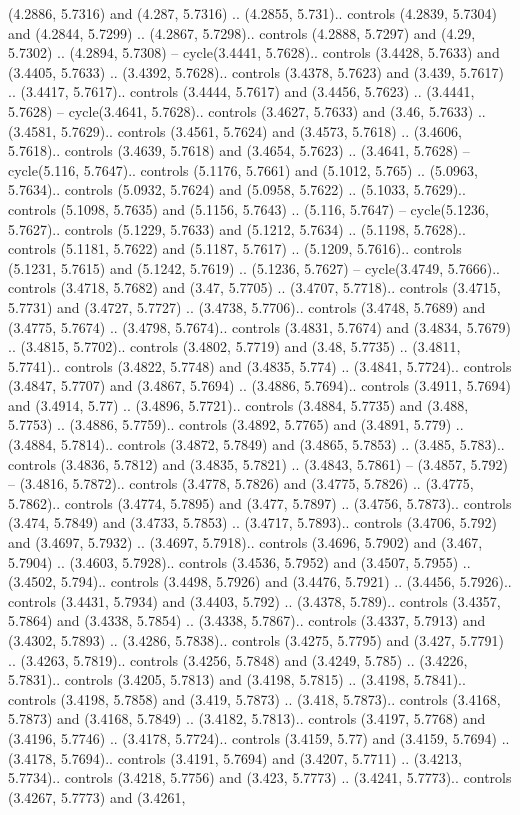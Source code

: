 (4.2886, 5.7316) and (4.287, 5.7316) .. (4.2855, 5.731).. controls (4.2839, 5.7304) and (4.2844, 5.7299) .. (4.2867, 5.7298).. controls (4.2888, 5.7297) and (4.29, 5.7302) .. (4.2894, 5.7308) -- cycle(3.4441, 5.7628).. controls (3.4428, 5.7633) and (3.4405, 5.7633) .. (3.4392, 5.7628).. controls (3.4378, 5.7623) and (3.439, 5.7617) .. (3.4417, 5.7617).. controls (3.4444, 5.7617) and (3.4456, 5.7623) .. (3.4441, 5.7628) -- cycle(3.4641, 5.7628).. controls (3.4627, 5.7633) and (3.46, 5.7633) .. (3.4581, 5.7629).. controls (3.4561, 5.7624) and (3.4573, 5.7618) .. (3.4606, 5.7618).. controls (3.4639, 5.7618) and (3.4654, 5.7623) .. (3.4641, 5.7628) -- cycle(5.116, 5.7647).. controls (5.1176, 5.7661) and (5.1012, 5.765) .. (5.0963, 5.7634).. controls (5.0932, 5.7624) and (5.0958, 5.7622) .. (5.1033, 5.7629).. controls (5.1098, 5.7635) and (5.1156, 5.7643) .. (5.116, 5.7647) -- cycle(5.1236, 5.7627).. controls (5.1229, 5.7633) and (5.1212, 5.7634) .. (5.1198, 5.7628).. controls (5.1181, 5.7622) and (5.1187, 5.7617) .. (5.1209, 5.7616).. controls (5.1231, 5.7615) and (5.1242, 5.7619) .. (5.1236, 5.7627) -- cycle(3.4749, 5.7666).. controls (3.4718, 5.7682) and (3.47, 5.7705) .. (3.4707, 5.7718).. controls (3.4715, 5.7731) and (3.4727, 5.7727) .. (3.4738, 5.7706).. controls (3.4748, 5.7689) and (3.4775, 5.7674) .. (3.4798, 5.7674).. controls (3.4831, 5.7674) and (3.4834, 5.7679) .. (3.4815, 5.7702).. controls (3.4802, 5.7719) and (3.48, 5.7735) .. (3.4811, 5.7741).. controls (3.4822, 5.7748) and (3.4835, 5.774) .. (3.4841, 5.7724).. controls (3.4847, 5.7707) and (3.4867, 5.7694) .. (3.4886, 5.7694).. controls (3.4911, 5.7694) and (3.4914, 5.77) .. (3.4896, 5.7721).. controls (3.4884, 5.7735) and (3.488, 5.7753) .. (3.4886, 5.7759).. controls (3.4892, 5.7765) and (3.4891, 5.779) .. (3.4884, 5.7814).. controls (3.4872, 5.7849) and (3.4865, 5.7853) .. (3.485, 5.783).. controls (3.4836, 5.7812) and (3.4835, 5.7821) .. (3.4843, 5.7861) -- (3.4857, 5.792) -- (3.4816, 5.7872).. controls (3.4778, 5.7826) and (3.4775, 5.7826) .. (3.4775, 5.7862).. controls (3.4774, 5.7895) and (3.477, 5.7897) .. (3.4756, 5.7873).. controls (3.474, 5.7849) and (3.4733, 5.7853) .. (3.4717, 5.7893).. controls (3.4706, 5.792) and (3.4697, 5.7932) .. (3.4697, 5.7918).. controls (3.4696, 5.7902) and (3.467, 5.7904) .. (3.4603, 5.7928).. controls (3.4536, 5.7952) and (3.4507, 5.7955) .. (3.4502, 5.794).. controls (3.4498, 5.7926) and (3.4476, 5.7921) .. (3.4456, 5.7926).. controls (3.4431, 5.7934) and (3.4403, 5.792) .. (3.4378, 5.789).. controls (3.4357, 5.7864) and (3.4338, 5.7854) .. (3.4338, 5.7867).. controls (3.4337, 5.7913) and (3.4302, 5.7893) .. (3.4286, 5.7838).. controls (3.4275, 5.7795) and (3.427, 5.7791) .. (3.4263, 5.7819).. controls (3.4256, 5.7848) and (3.4249, 5.785) .. (3.4226, 5.7831).. controls (3.4205, 5.7813) and (3.4198, 5.7815) .. (3.4198, 5.7841).. controls (3.4198, 5.7858) and (3.419, 5.7873) .. (3.418, 5.7873).. controls (3.4168, 5.7873) and (3.4168, 5.7849) .. (3.4182, 5.7813).. controls (3.4197, 5.7768) and (3.4196, 5.7746) .. (3.4178, 5.7724).. controls (3.4159, 5.77) and (3.4159, 5.7694) .. (3.4178, 5.7694).. controls (3.4191, 5.7694) and (3.4207, 5.7711) .. (3.4213, 5.7734).. controls (3.4218, 5.7756) and (3.423, 5.7773) .. (3.4241, 5.7773).. controls (3.4267, 5.7773) and (3.4261, 